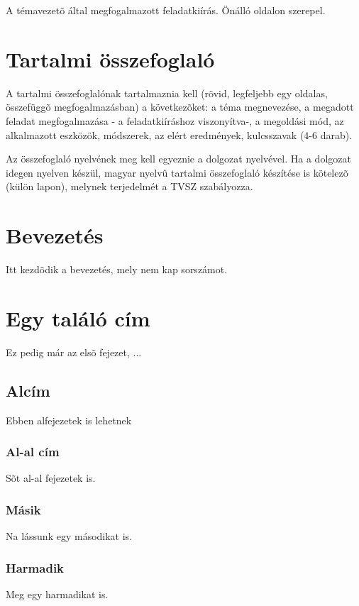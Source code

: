 \documentclass[12pt]{report}
\theoremstyle{definition}
\begin{document}
A témavezetõ által megfogalmazott feladatkiírás. Önálló oldalon szerepel.

\chapter*{Tartalmi összefoglaló}

A tartalmi összefoglalónak tartalmaznia kell (rövid, legfeljebb egy oldalas, összefüggõ megfogalmazásban)
a következõket: a téma megnevezése, a megadott feladat megfogalmazása - a feladatkiíráshoz viszonyítva-,
a megoldási mód, az alkalmazott eszközök, módszerek, az elért eredmények, kulcsszavak (4-6 darab).

Az összefoglaló nyelvének meg kell egyeznie a dolgozat nyelvével. Ha a dolgozat idegen nyelven készül,
magyar nyelvû tartalmi összefoglaló készítése is kötelezõ (külön lapon), melynek terjedelmét a TVSZ szabályozza.


\chapter*{Bevezetés}

Itt kezdõdik a bevezetés, mely nem kap sorszámot.



\chapter{Egy találó cím}

Ez pedig már az elsõ fejezet, ...

\section{Alcím}
Ebben alfejezetek is lehetnek

\subsection{Al-al cím}
Sõt al-al fejezetek is.

\subsection{Másik}
Na lássunk egy másodikat is.

\subsection{Harmadik}
Meg egy harmadikat is.
\end{document}
